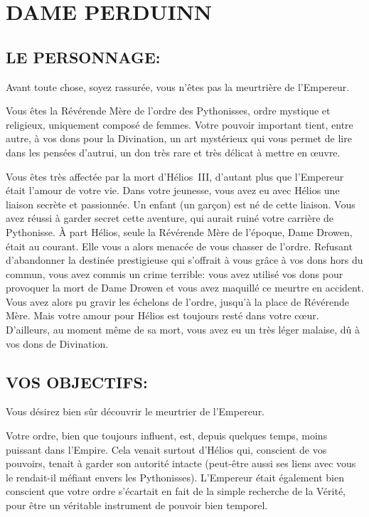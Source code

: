 \documentclass[14pt,twocolumn]{extarticle}
\begin{document}
\section{DAME PERDUINN}

\subsection{LE PERSONNAGE:}

Avant toute chose, soyez rassurée, vous n'êtes pas la meurtrière de l'Empereur.

Vous êtes la Révérende Mère de l'ordre des Pythonisses, ordre mystique et
religieux, uniquement composé de femmes. Votre pouvoir important tient, entre
autre, à vos dons pour la Divination, un art mystérieux qui vous permet de lire
dans les pensées d'autrui, un don très rare et très délicat à mettre en œuvre.

Vous êtes très affectée par la mort d'Hélios~III, d'autant plus que l'Empereur
était l'amour de votre vie. Dans votre jeunesse, vous avez eu avec Hélios une
liaison secrète et passionnée. Un enfant (un garçon) est né de cette liaison.
Vous avez réussi à garder secret cette aventure, qui aurait ruiné votre
carrière de Pythonisse. À part Hélios, seule la Révérende Mère de l'époque,
Dame Drowen, était au courant. Elle vous a alors menacée de vous chasser de
l'ordre. Refusant d'abandonner la destinée prestigieuse qui s'offrait à vous
grâce à vos dons hors du commun, vous avez commis un crime terrible: vous avez
utilisé vos dons pour provoquer la mort de Dame Drowen et vous avez maquillé
ce meurtre en accident. Vous avez alors pu gravir les échelons de l'ordre,
jusqu'à la place de Révérende Mère. Mais votre amour pour Hélios est toujours
resté dans votre cœur. D'ailleurs, au moment même de sa mort, vous avez eu
un très léger malaise, dû à vos dons de Divination.

\subsection{VOS OBJECTIFS:}

Vous désirez bien sûr découvrir le meurtrier de l'Empereur.

Votre ordre, bien que toujours influent, est, depuis quelques temps, moins
puissant dans l'Empire. Cela venait surtout d'Hélios qui, conscient de vos
pouvoirs, tenait à garder son autorité intacte (peut-être aussi ses liens avec
vous le rendait-il méfiant envers les Pythonisses). L'Empereur était également
bien conscient que votre ordre s'écartait en fait de la simple recherche de la
Vérité, pour être un véritable instrument de pouvoir bien temporel.
\end{document}
